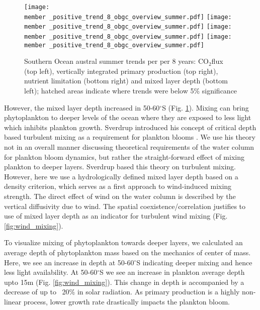 \documentclass[12pt]{article}
\newcommand{\member}{m182_1988_1995} %
\begin{document}
\begin{figure}[h]
\texttt{[image: \\member \_positive\_trend\_8\_obgc\_overview\_summer.pdf]} %
\texttt{[image: \\member \_positive\_trend\_8\_obgc\_overview\_summer.pdf]} %
\texttt{[image: \\member \_positive\_trend\_8\_obgc\_overview\_summer.pdf]} %
\texttt{[image: \\member \_positive\_trend\_8\_obgc\_overview\_summer.pdf]} %
\caption{Southern Ocean austral summer trends per per 8 years: CO$_2$flux (top left), vertically integrated primary production (top right), nutrient limitation (bottom right) and mixed layer depth (bottom left); hatched areas indicate where trends were below 5\% significance}
\label{fig:co2flux_intpp}
\end{figure}

However, the mixed layer depth increased in 50-60$^\circ$S (Fig. \ref{fig:co2flux_intpp}). Mixing can bring phytoplankton to deeper levels of the ocean where they are exposed to less light which inhibits plankton growth. Sverdrup \citep{Sverdrup1953} introduced his concept of critical depth based turbulent mixing as a requirement for plankton blooms \citep{Franks2014}. We use his theory not in an overall manner discussing theoretical requirements of the water column for plankton bloom dynamics, but rather the straight-forward effect of mixing plankton to deeper layers. Sverdrup based this theory on turbulent mixing. However, here we use a hydrologically defined mixed layer depth based on a density criterion, which serves as a first approach to wind-induced mixing strength. The direct effect of wind on the water column is described by the vertical diffusivity due to wind. The spatial coexistence/correlation justifies to use of mixed layer depth as an indicator for turbulent wind mixing (Fig. \ref{fig:wind_mixing}).  

To visualize mixing of phytoplankton towards deeper layers, we calculated an average depth of phytoplankton mass based on the mechanics of center of mass. Here, we see an increase in depth at 50-60$^\circ$S indicating deeper mixing and hence less light availability. At 50-60$^\circ$S we see an increase in plankton average depth upto 15m (Fig. \ref{fig:wind_mixing}). This change in depth is accompanied by a decrease of up to ~20\% in solar radiation. As primary production is a highly non-linear process, lower growth rate drastically impacts the plankton bloom.
\end{document}
